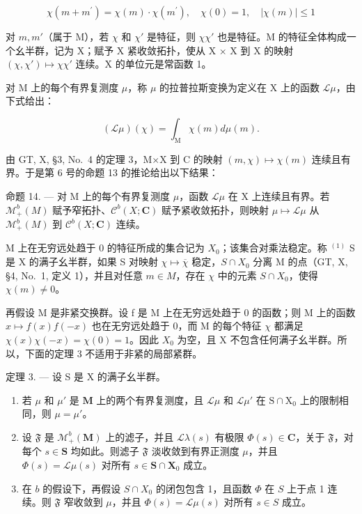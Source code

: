 \[
\chi (m + m ^ {\prime}) = \chi (m) \cdot \chi (m ^ {\prime}), \quad \chi (0) = 1, \quad | \chi (m) | \leqslant 1\tag{7}
\]

对 \(m, m'\)（属于 M），若 \(\chi\) 和 \(\chi'\) 是特征，则 \(\chi\chi'\) 也是特征。M 的特征全体构成一个幺半群，记为 X；赋予 X 紧收敛拓扑，使从 X × X 到 X 的映射 \((\chi, \chi') \mapsto \chi\chi'\) 连续。X 的单位元是常函数 1。

对 M 上的每个有界复测度 \(\mu\)，称 \(\mu\) 的拉普拉斯变换为定义在 X 上的函数 \(\mathcal{L}\mu\)，由下式给出：

\[
(\mathscr {L} \mu) (\chi) = \int_ {\mathrm{M}} \chi (m) d \mu (m).\tag{8}
\]

由 GT, X, §3, No.~4 的定理 3，M×X 到 C 的映射 \((m,\chi)\mapsto\chi(m)\) 连续且有界。于是第 6 号的命题 13 的推论给出以下结果：

命题 14. --- 对 M 上的每个有界复测度 \(\mu\)，函数 \(\mathcal{L}\mu\) 在 X 上连续且有界。若 \(\mathcal{M}_{+}^{b}(M)\) 赋予窄拓扑、\(\mathcal{C}^{b}(X; \mathbf{C})\) 赋予紧收敛拓扑，则映射 \(\mu \mapsto \mathcal{L}\mu\) 从 \(\mathcal{M}_{+}^{b}(M)\) 到 \(\mathcal{C}^{b}(X; \mathbf{C})\) 连续。

M 上在无穷远处趋于 0 的特征所成的集合记为 \(X_{0}\)；该集合对乘法稳定。称 \(^{(1)}\) S 是 X 的满子幺半群，如果 S 对映射 \(\chi\mapsto\overline{\chi}\) 稳定，\(S\cap X_{0}\) 分离 M 的点（GT, X, §4, No.~1, 定义 1），并且对任意 \(m\in M\)，存在 \(\chi\) 中的元素 \(S\cap X_{0}\)，使得 \(\chi(m)\neq0\)。

再假设 M 是非紧交换群。设 f 是 M 上在无穷远处趋于 0 的函数；则 M 上的函数 \(x \mapsto f(x)f(-x)\) 也在无穷远处趋于 0，而 M 的每个特征 \(\chi\) 都满足 \(\chi(x)\chi(-x) = \chi(0) = 1\)。因此 \(X_{0}\) 为空，且 X 不包含任何满子幺半群。所以，下面的定理 3 不适用于非紧的局部紧群。

定理 3. --- 设 S 是 X 的满子幺半群。

\begin{enumerate}
\def\labelenumi{\alph{enumi})}
\item
  若 \(\mu\) 和 \(\mu'\) 是 \(\mathbf{M}\) 上的两个有界复测度，且 \(\mathcal{L}\mu\) 和 \(\mathcal{L}\mu'\) 在 \(\mathrm{S} \cap \mathrm{X}_0\) 上的限制相同，则 \(\mu = \mu'\)。
\item
  设 \(\mathfrak{F}\) 是 \(\mathcal{M}_{+}^{b}(\mathbf{M})\) 上的滤子，并且 \(\mathcal{L}\lambda(s)\) 有极限 \(\Phi(s) \in \mathbf{C}\)，关于 \(\mathfrak{F}\)，对每个 \(s \in \mathbf{S}\) 均如此。则滤子 \(\mathfrak{F}\) 淡收敛到有界正测度 \(\mu\)，并且 \(\Phi(s) = \mathcal{L}\mu(s)\) 对所有 \(s \in \mathbf{S} \cap \mathbf{X}_0\) 成立。
\item
  在 \(b\) 的假设下，再假设 \(S \cap X_0\) 的闭包包含 1，且函数 \(\Phi\) 在 \(S\) 上于点 1 连续。则 \(\mathfrak{F}\) 窄收敛到 \(\mu\)，并且 \(\Phi(s) = \mathcal{L}\mu(s)\) 对所有 \(s \in S\) 成立。
\end{enumerate}

